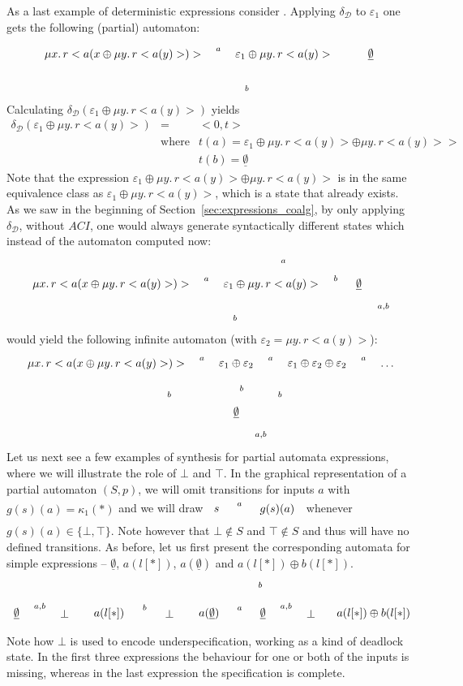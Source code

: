 \documentclass{LMCS}
\newcommand\D{\mathcal{D}}
\newcommand\E\varepsilon
\newcommand\emp{\underline\emptyset}
\theoremstyle{definition}
\theoremstyle{plain}
\theoremstyle{plain}
\theoremstyle{plain}
\theoremstyle{plain}
\theoremstyle{definition}
\theoremstyle{definition}
\begin{document}
As a last example of deterministic expressions consider
\scalebox{.95}{$\E_1 = \mu
x.\, r<a(x \oplus \mu y. r<a(y)>)>$}.
Applying $\delta_\D$ to $\E_1$ one gets the following (partial)
automaton:
\[
\xymatrix{*+[F-:<3pt>]{\mu
x.\, r<a(x \oplus \mu y.\, r<a(y)>)>}
\ar[r]^-{a}\ar@/{}_{2 pc}/[rr]_{b}&
*+[F-:<3pt>]{\E_1 \oplus \mu y.\, r<a(y)>}
&*++[o][F]{\emp } }
\]
Calculating $\delta_\D(\E_1 \oplus \mu y.\, r<a(y)>)$ yields
\[
\begin{array}{lcl}
\delta_\D(\E_1 \oplus \mu y.\, r<a(y)>)& =& <0,t>\\
&\text{where}& t(a) = \E_1 \oplus \mu y.\,
r<a(y)>\oplus \mu y.\, r<a(y)>>\\
&& t(b) = \emp
\end{array}
\]
Note that the expression $\E_1 \oplus \mu y.\,
r<a(y)>\oplus \mu y.\, r<a(y)>$ is in the same equivalence class as $\E_1 \oplus \mu y.\, r<a(y)>$, which is a state that already exists.
As we saw in the beginning of Section~\ref{sec:expressions_coalg}, by only
applying $\delta_\D$, without $\mathit{ACI}$, one would always generate syntactically different states which instead of
the automaton computed now:
\[
\xymatrix{*+[F-:<3pt>]{\mu
x.\,r< a(x \oplus \mu y.\, r<a(y)>)>}
\ar[r]^-{a}\ar@/{}_{2 pc}/[rr]_{b}& *+[F-:<3pt>]{
\E_1 \oplus \mu y.\, r<a(y)>}\ar@(r,u)[]_-{a}\ar[r]^-{b}
&*++[o][F]{\emp} \ar@(r,d)[]^{a,b} }
\]
would yield the following infinite automaton (with $\E_2 = \mu y.\,
r<a(y)>$):
\[
\xymatrix{*+[F-:<3pt>]{\mu
x.\, r<a(x \oplus \mu y.\, r<a(y)>)>} \ar[r]^-{a}\ar[dr]_{b}&
*+[F-:<3pt>]{\E_1 \oplus \E_2}\ar[r]^-{a}\ar[d]^{b}&
*+[F-:<3pt>]{\E_1 \oplus \E_2 \oplus \E_2}\ar[r]^-{a}\ar[dl]^{b}&\ldots\\
&*++[o][F]{\emp} \ar@(r,d)[]^{a,b} &}
\]
Let us next see a few examples of synthesis for partial automata
expressions, where we will illustrate the role of $\bot$ and $\top$.
In the graphical representation of a partial
automaton $(S,p)$, we will omit transitions for inputs $a$ with
$g(s)(a) = \kappa_1(*)$ and we will draw $\xymatrix{*++[o][F]{s} \ar@{~>}[r]^-{a}&
*++[F]{g(s)(a)}}$ whenever $g(s)(a)\in\{\bot,\top\}$. Note however
that
$\bot\not\in S$ and $\top\not\in S$ and thus will have no defined
transitions. As before, let us first present the corresponding
automata for simple expressions -- $\emp$, $a(l[*])$,
$a(\emp)$  and $a(l[*]) \oplus b(l[*])$.
\[
\xymatrix{*++[o][F]{\emp} \ar@{~>}[r]^-{a,b}& *++[F]{\bot}} \ \ \
\xymatrix{*++[o][F]{a(l[*])} \ar@{~>}[r]^-{b}&  *++[F]{\bot }}
\ \ \ \xymatrix{*++[o][F] {a(\emp)}
\ar[r]^-{a}\ar@{~>}@/^0.7cm/[rr]^-{b}&  *++[o][F]{\emp} \ar@{~>}[r]^-{a,b}&
*++[F]{\bot}}\ \ \ \xymatrix{*+[F-:<3pt>]{a(l[*]) \oplus
b(l[*])} }
\]
Note how $\bot$ is used to encode
underspecification, working as a kind of deadlock state. In the first 
three expressions the behaviour for one or both of the
inputs is missing, whereas in the last expression the specification
is complete. 
\end{document}
